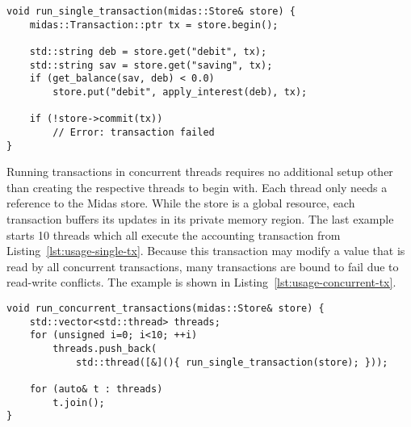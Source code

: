 \begin{lstlisting}[caption={A single transaction on account data.},captionpos=b, label=lst:usage-single-tx]
void run_single_transaction(midas::Store& store) {
    midas::Transaction::ptr tx = store.begin();

    std::string deb = store.get("debit", tx);
    std::string sav = store.get("saving", tx);
    if (get_balance(sav, deb) < 0.0)
        store.put("debit", apply_interest(deb), tx);

    if (!store->commit(tx))
        // Error: transaction failed
}
\end{lstlisting}

Running transactions in concurrent threads requires no additional setup other
than creating the respective threads to begin with. Each thread only needs a
reference to the Midas store. While the store is a global resource, each
transaction buffers its updates in its private memory region. The last example
starts 10 threads which all execute the accounting transaction from
Listing~\ref{lst:usage-single-tx}. Because this transaction may modify a value
that is read by all concurrent transactions, many transactions are bound to fail
due to read-write conflicts. The example is shown in
Listing~\ref{lst:usage-concurrent-tx}.

\vspace{0.5cm}

\begin{lstlisting}[caption={Several concurrent accounting transactions on the same store.},captionpos=b, label=lst:usage-concurrent-tx]
void run_concurrent_transactions(midas::Store& store) {
    std::vector<std::thread> threads;
    for (unsigned i=0; i<10; ++i)
        threads.push_back(
            std::thread([&](){ run_single_transaction(store); }));

    for (auto& t : threads)
        t.join();
}
\end{lstlisting}
